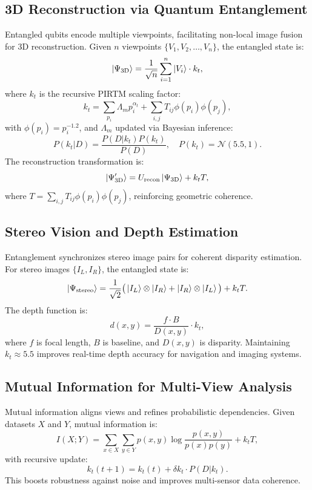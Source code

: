 \documentclass{article}
\theoremstyle{plain}
\begin{document}
\subsection{3D Reconstruction via Quantum Entanglement}
Entangled qubits encode multiple viewpoints, facilitating non-local image fusion for 3D reconstruction. Given \( n \) viewpoints \( \{V_1, V_2, \dots, V_n\} \), the entangled state is:
\begin{equation}
\ket{\Psi_\text{3D}} = \frac{1}{\sqrt{n}} \sum_{i=1}^{n} \ket{V_i} \cdot k_t,
\end{equation}
where \( k_t \) is the recursive PIRTM scaling factor:
\begin{equation}
k_t = \sum_{p_i} \Lambda_m p_i^{\alpha_t} + \sum_{i,j} T_{ij} \phi(p_i) \phi(p_j),
\end{equation}
with \( \phi(p_i) = p_i^{-1.2} \), and \( \Lambda_m \) updated via Bayesian inference:
\begin{equation}
P(k_t | D) = \frac{P(D | k_t) P(k_t)}{P(D)}, \quad P(k_t) = \mathcal{N}(5.5, 1).
\end{equation}
The reconstruction transformation is:
\begin{equation}
\ket{\Psi_\text{3D}'} = U_\text{recon} \ket{\Psi_\text{3D}} + k_t T,
\end{equation}
where \( T = \sum_{i,j} T_{ij} \phi(p_i) \phi(p_j) \), reinforcing geometric coherence.

\subsection{Stereo Vision and Depth Estimation}
Entanglement synchronizes stereo image pairs for coherent disparity estimation. For stereo images \( \{I_L, I_R\} \), the entangled state is:
\begin{equation}
\ket{\Psi_\text{stereo}} = \frac{1}{\sqrt{2}} \big(\ket{I_L} \otimes \ket{I_R} + \ket{I_R} \otimes \ket{I_L}\big) + k_t T.
\end{equation}
The depth function is:
\begin{equation}
d(x, y) = \frac{f \cdot B}{D(x, y)} \cdot k_t,
\end{equation}
where \( f \) is focal length, \( B \) is baseline, and \( D(x, y) \) is disparity. Maintaining \( k_t \approx 5.5 \) improves real-time depth accuracy for navigation and imaging systems.

\subsection{Mutual Information for Multi-View Analysis}
Mutual information aligns views and refines probabilistic dependencies. Given datasets \( X \) and \( Y \), mutual information is:
\begin{equation}
I(X; Y) = \sum_{x \in X} \sum_{y \in Y} p(x, y) \log \frac{p(x, y)}{p(x)p(y)} + k_t T,
\end{equation}
with recursive update:
\begin{equation}
k_t(t+1) = k_t(t) + \delta k_t \cdot P(D | k_t).
\end{equation}
This boosts robustness against noise and improves multi-sensor data coherence.
\end{document}
